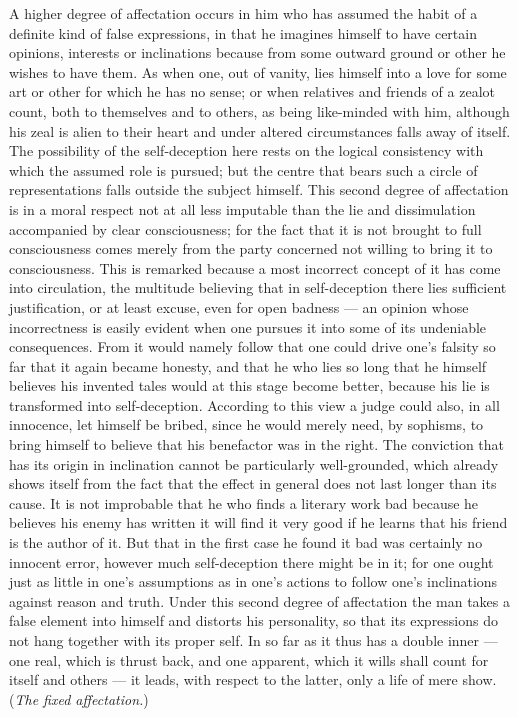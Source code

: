 \documentclass[12pt]{article}
\newcommand{\opage}[1]{\marginnote{\footnotesize\textit{[#1]}}}
\begin{document}
A higher degree of affectation occurs in him who has assumed the habit of a definite kind of false expressions, in that he imagines himself to have certain opinions, interests or inclinations because from some outward ground or other he wishes to have them. As when one, out of vanity, lies himself into a love for some art or other for which he has no sense; or when relatives and friends of a zealot count, both to themselves and to others, as being like-minded with him, although his zeal is alien to their heart and under altered circum\opage{171}stances falls away of itself. The possibility of the self-deception here rests on the logical consistency with which the assumed role is pursued; but the centre that bears such a circle of representations falls outside the subject himself. This second degree of affectation is in a moral respect not at all less imputable than the lie and dissimulation accompanied by clear consciousness; for the fact that it is not brought to full consciousness comes merely from the party concerned not willing to bring it to consciousness. This is remarked because a most incorrect concept of it has come into circulation, the multitude believing that in self-deception there lies sufficient justification, or at least excuse, even for open badness --- an opinion whose incorrectness is easily evident when one pursues it into some of its undeniable consequences. From it would namely follow that one could drive one's falsity so far that it again became honesty, and that he who lies so long that he himself believes his invented tales would at this stage become better, because his lie is transformed into self-deception. According to this view a judge could also, in all innocence, let himself be bribed, since he would merely need, by sophisms, to bring himself to believe that his benefactor was in the right. The conviction that has its origin in inclination cannot be particularly well-grounded, which already shows itself from the fact that the effect in general does not last longer than its cause. It is not improbable that he who finds a literary work bad because he believes his enemy has written it will find it very good if he learns that his friend is the author of it. But that in the first case he found it bad was certainly no innocent error, however much self-deception there might be in it; for one ought just as little in one's assumptions as in one's actions to follow one's inclinations against reason and truth. Under this second degree of affectation the man takes a false element into himself and distorts his personality, so \opage{172}that its expressions do not hang together with its proper self. In so far as it thus has a double inner --- one real, which is thrust back, and one apparent, which it wills shall count for itself and others --- it leads, with respect to the latter, only a life of mere show. (\emph{The fixed affectation.})
\end{document}
